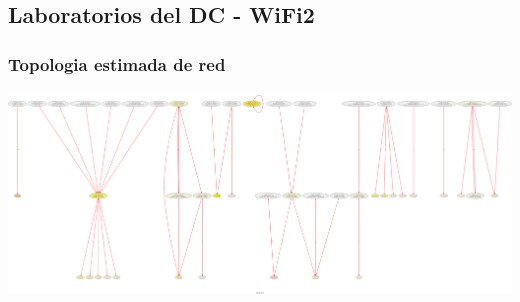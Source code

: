 \subsection{Laboratorios del DC - WiFi2}%
\subsubsection{Topologia estimada de red}
\includegraphics[scale=0.22]{../experimentacion-svilerino/licar/graph.png}

